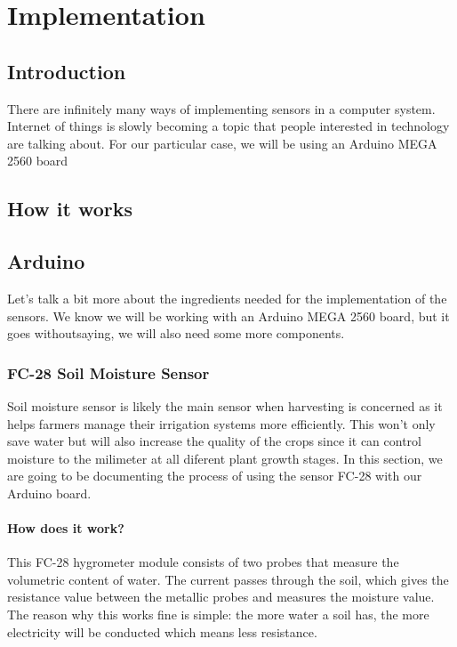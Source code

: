 \chapter{Implementation}\label{cap:implementacion}

\section{Introduction}
There are infinitely many ways of implementing sensors in a computer system. Internet of things is slowly becoming a topic that people interested in technology are talking about. For our particular case, we will be using an Arduino MEGA 2560 board

\section {How it works}

\section{Arduino}
Let's talk a bit more about the ingredients needed for the implementation of the sensors. We know we will be working with an Arduino MEGA 2560 board, but it goes withoutsaying, we will also need some more components. 

\subsection{FC-28 Soil Moisture Sensor}
Soil moisture sensor is likely the main sensor when harvesting is concerned as it helps farmers manage their irrigation systems more efficiently. This won't only save water but will also increase the quality of the crops since it can control moisture to the milimeter at all diferent plant growth stages. In this section, we are going to be documenting the process of using the sensor FC-28 with our Arduino board.

\subsubsection{How does it work?}
This FC-28 hygrometer module consists of two probes that measure the volumetric content of water. The current passes through the soil, which gives the resistance value between the metallic probes and measures the moisture value. The reason why this works fine is simple: the more water a soil has, the more electricity will be conducted which means less resistance.

